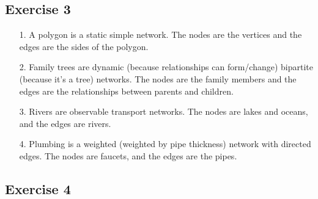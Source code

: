 \documentclass{article}
\begin{document}
\newpage

\subsection*{Exercise 3}

\begin{enumerate}
  \item[1.]
  A polygon is a static simple network. The nodes are the vertices and the edges
  are the sides of the polygon.
  
  \item[2.]
  Family trees are dynamic (because relationships can form/change) bipartite
  (because it's a tree) networks. The nodes are the family members and the edges
  are the relationships between parents and children.

  \item[3.]
  Rivers are observable transport networks. The nodes are lakes and oceans, and
  the edges are rivers.

  \item[4.]
  Plumbing is a weighted (weighted by pipe thickness) network with directed
  edges. The nodes are faucets, and the edges are the pipes.
\end{enumerate}

\newpage

\subsection*{Exercise 4}
\end{document}
